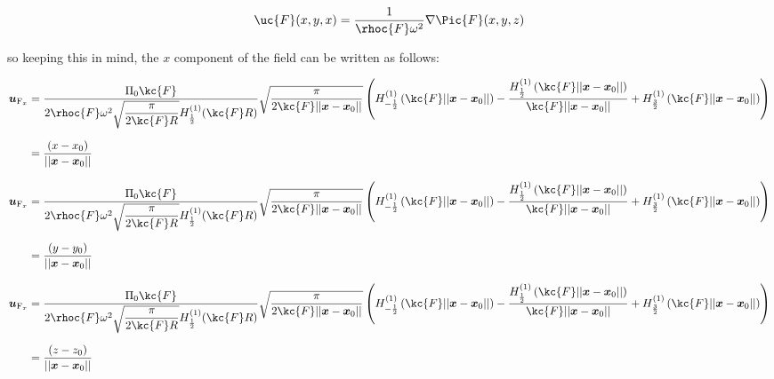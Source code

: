 \documentclass{article}[a4paper, 12pt]
\begin{document}
\begin{equation}
  \uc{F}(x,y,x) = \frac{1}{\rhoc{F}\omega^2}\nabla\Pic{F}(x,y,z)
\end{equation}

so keeping this in mind, the $x$ component of the field can be written as follows:

\begin{align*}
    \bm{u}_{\mathrm{F}_x} &= 
    \frac{\Pi_0\kc{F}}{2\rhoc{F}\omega^2\sqrt{\displaystyle\frac{\pi}{2\kc{F}R}}H_{\frac{1}{2}}^{(1)}(\kc{F}R)} \sqrt{\frac{\pi}{2\kc{F}||\bm{x}-\bm{x}_0||}}\left(H_{-\frac{1}{2}}^{(1)}\left(\kc{F}||\bm{x}-\bm{x}_0||\right)-\frac{H_{\frac{1}{2}}^{(1)}\left(\kc{F}||\bm{x}-\bm{x}_0||\right)}{\kc{F}||\bm{x}-\bm{x}_0||} + H_{\frac{3}{2}}^{(1)}\left(\kc{F}||\bm{x}-\bm{x}_0||\right)\right)\\[1.5ex]
    &=\frac{\left(x-x_0\right)}{||\bm{x}-\bm{x}_0||}
\end{align*}


\begin{align*}
    \bm{u}_{\mathrm{F}_x} &= 
    \frac{\Pi_0\kc{F}}{2\rhoc{F}\omega^2\sqrt{\displaystyle\frac{\pi}{2\kc{F}R}}H_{\frac{1}{2}}^{(1)}(\kc{F}R)} \sqrt{\frac{\pi}{2\kc{F}||\bm{x}-\bm{x}_0||}}\left(H_{-\frac{1}{2}}^{(1)}\left(\kc{F}||\bm{x}-\bm{x}_0||\right)-\frac{H_{\frac{1}{2}}^{(1)}\left(\kc{F}||\bm{x}-\bm{x}_0||\right)}{\kc{F}||\bm{x}-\bm{x}_0||} + H_{\frac{3}{2}}^{(1)}\left(\kc{F}||\bm{x}-\bm{x}_0||\right)\right)\\[1.5ex]
    &=\frac{\left(y-y_0\right)}{||\bm{x}-\bm{x}_0||}
\end{align*}


\begin{align*}
    \bm{u}_{\mathrm{F}_x} &= 
    \frac{\Pi_0\kc{F}}{2\rhoc{F}\omega^2\sqrt{\displaystyle\frac{\pi}{2\kc{F}R}}H_{\frac{1}{2}}^{(1)}(\kc{F}R)} \sqrt{\frac{\pi}{2\kc{F}||\bm{x}-\bm{x}_0||}}\left(H_{-\frac{1}{2}}^{(1)}\left(\kc{F}||\bm{x}-\bm{x}_0||\right)-\frac{H_{\frac{1}{2}}^{(1)}\left(\kc{F}||\bm{x}-\bm{x}_0||\right)}{\kc{F}||\bm{x}-\bm{x}_0||} + H_{\frac{3}{2}}^{(1)}\left(\kc{F}||\bm{x}-\bm{x}_0||\right)\right)\\[1.5ex]
    &=\frac{\left(z-z_0\right)}{||\bm{x}-\bm{x}_0||}
\end{align*}
\end{document}
